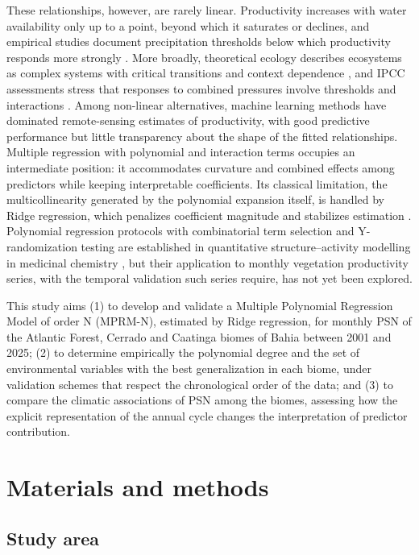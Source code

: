 \documentclass[a4paper,fleqn]{cas-sc}
\begin{document}
These relationships, however, are rarely linear. Productivity increases with water availability only up to a point, beyond which it saturates or declines, and empirical studies document precipitation thresholds below which productivity responds more strongly \citep{jin2018,linger2020,mwangi2025}. More broadly, theoretical ecology describes ecosystems as complex systems with critical transitions and context dependence \citep{levin1998,flores2024}, and IPCC assessments stress that responses to combined pressures involve thresholds and interactions \citep{ipcc2022}. Among non-linear alternatives, machine learning methods have dominated remote-sensing estimates of productivity, with good predictive performance but little transparency about the shape of the fitted relationships. Multiple regression with polynomial and interaction terms occupies an intermediate position: it accommodates curvature and combined effects among predictors while keeping interpretable coefficients. Its classical limitation, the multicollinearity generated by the polynomial expansion itself, is handled by Ridge regression, which penalizes coefficient magnitude and stabilizes estimation \citep{hoerl1970}. Polynomial regression protocols with combinatorial term selection and Y-randomization testing are established in quantitative structure--activity modelling in medicinal chemistry \citep{guimaraes2024}, but their application to monthly vegetation productivity series, with the temporal validation such series require, has not yet been explored.

This study aims (1) to develop and validate a Multiple Polynomial Regression Model of order N (MPRM-N), estimated by Ridge regression, for monthly PSN of the Atlantic Forest, Cerrado and Caatinga biomes of Bahia between 2001 and 2025; (2) to determine empirically the polynomial degree and the set of environmental variables with the best generalization in each biome, under validation schemes that respect the chronological order of the data; and (3) to compare the climatic associations of PSN among the biomes, assessing how the explicit representation of the annual cycle changes the interpretation of predictor contribution.

\section{Materials and methods}\label{sec:methods}

\subsection{Study area}
\end{document}
